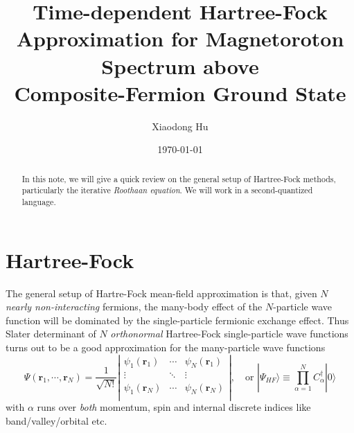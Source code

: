\documentclass[aps,prb,nofootinbib,reprint,onecolumn]{revtex4-2}
\begin{document}
\title{Time-dependent Hartree-Fock Approximation for Magnetoroton Spectrum above\\Composite-Fermion Ground State}
\author{Xiaodong Hu}
\date{\today}

\begin{abstract}
	In this note, we will give a quick review on the general setup of Hartree-Fock methods, particularly the iterative \emph{Roothaan equation}. We will work in a second-quantized language. 

\end{abstract}

\maketitle
\tableofcontents

\section{Hartree-Fock}
	The general setup of Hartre-Fock mean-field approximation is that, given $N$ \emph{nearly non-interacting} fermions, the many-body effect of the $N$-particle wave function will be dominated by the single-particle fermionic exchange effect. Thus Slater determinant of $N$ \emph{orthonormal} Hartree-Fock single-particle wave functions turns out to be a good approximation for the many-particle wave functions
	\begin{equation*}
		\Psi(\bm r_1,\cdots,\bm r_N)=\dfrac{1}{\sqrt{N!}}\left|\begin{array}{ccc}
			\psi_1(\bm r_1) &\cdots &\psi_N(\bm r_1)\\
			\vdots & \ddots & \vdots\\
			\psi_1(\bm r_N) &\cdots &\psi_N(\bm r_N)\\
		\end{array}\right|,\quad\text{or }|\Psi_{HF}\rangle\equiv\prod_{\alpha=1}^N C_\alpha^\dagger|0\rangle
	\end{equation*}
	with $\alpha$ runs over \emph{both} momentum, spin and internal discrete indices like band/valley/orbital etc.
\end{document}
